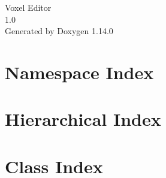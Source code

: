 \documentclass[twoside]{book}
\newcommand{\+}{\discretionary{\mbox{\scriptsize$\hookleftarrow$}}{}{}}
\newcommand{\clearemptydoublepage}{%
    \newpage{\pagestyle{empty}\cleardoublepage}%
  }
\begin{document}
  \raggedbottom
    \hypersetup{pageanchor=false,
                bookmarksnumbered=true,
                pdfencoding=unicode
               }
  \begin{titlepage}
  \vspace*{7cm}
  \begin{center}%
  {\Large Voxel Editor}\\
  [1ex]\large 1.\+0 \\
  \vspace*{1cm}
  {\large Generated by Doxygen 1.14.0}\\
  \end{center}
  \end{titlepage}
  \clearemptydoublepage
  \tableofcontents
  \clearemptydoublepage
  \hypersetup{pageanchor=true}



























\chapter{Namespace Index}

\chapter{Hierarchical Index}

\chapter{Class Index}

\end{document}

